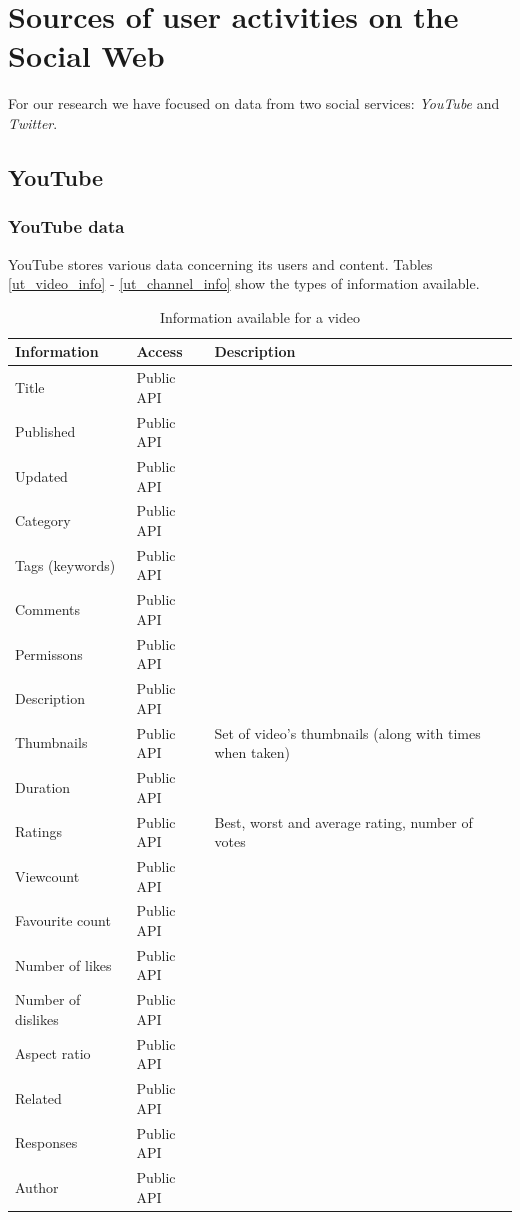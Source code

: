 \section{Sources of user activities on the Social Web}
For our research we have focused on data from two social services: \textit{YouTube} and \textit{Twitter}.
\subsection{YouTube}
\subsubsection{YouTube data}
YouTube stores various data concerning its users and content. Tables
\ref{ut_video_info} - \ref{ut_channel_info} show the types of information
available.

\begin{table}[ht]
	\begin{tabular}{|p{3cm} | l | p{4cm}|}\hline
		Information & Access & Description\\ \hline

		Title & Public API & \\
		Published & Public API & \\
		Updated & Public API & \\
		Category & Public API & \\
		Tags (keywords) & Public API & \\
		Comments & Public API & \\
		Permissons & Public API & \\
		Description & Public API & \\
		Thumbnails & Public API & Set of video's thumbnails (along with times
		when taken) \\
		Duration & Public API & \\
		Ratings & Public API & Best, worst and average rating, number of votes \\
		Viewcount & Public API & \\
		Favourite count & Public API & \\
		Number of likes & Public API & \\
		Number of dislikes & Public API & \\
		Aspect ratio & Public API & \\
		Related & Public API & \\
		Responses & Public API & \\
		Author & Public API & \\ \hline
	\end{tabular}
	\caption{Information available for a video}
\end{table}


